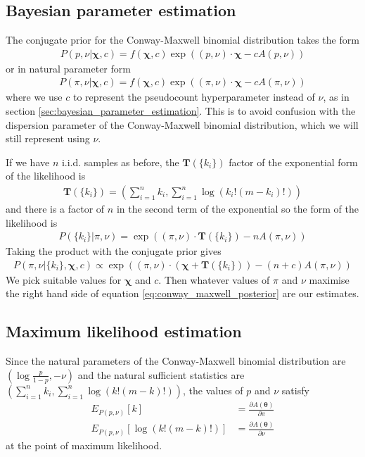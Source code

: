 \documentclass[a4paper,12pt]{article}
\theoremstyle{definition}
\newcommand{\pdiff}[2]{\frac{\partial #1}{\partial #2}} %
\begin{document}
\subsection{Bayesian parameter estimation}
The conjugate prior for the Conway-Maxwell binomial distribution takes the form
\begin{align}
  P(p, \nu | \boldsymbol{\chi}, c) = f(\boldsymbol{\chi}, c) \exp \left((p, \nu) \cdot \boldsymbol{\chi} - c A(p, \nu)\right)
\end{align}
or in natural parameter form 
\begin{align}
  P(\pi, \nu | \boldsymbol{\chi}, c) = f(\boldsymbol{\chi}, c) \exp \left((\pi, \nu) \cdot \boldsymbol{\chi} - c A(\pi, \nu)\right)
\end{align}
where we use $c$ to represent the pseudocount hyperparameter instead of $\nu$, as in section \ref{sec:bayesian_parameter_estimation}. This is to avoid confusion with the dispersion parameter of the Conway-Maxwell binomial distribution, which we will still represent using $\nu$.

If we have $n$ i.i.d. samples as before, the $\mathbf{T}(\lbrace k_i \rbrace)$ factor of the exponential form of the likelihood is 
\begin{align}
  \mathbf{T}(\lbrace k_i \rbrace) = \left( \sum_{i=1}^n k_i, \sum_{i=1}^n \log (k_i!(m - k_i)!) \right)
\end{align}
and there is a factor of $n$ in the second term of the exponential so the form of the likelihood is
\begin{align}
  P(\lbrace k_i \rbrace | \pi, \nu) = \exp \left( (\pi, \nu) \cdot \mathbf{T}(\lbrace k_i \rbrace) - nA (\pi, \nu)  \right)
\end{align}
Taking the product with the conjugate prior gives
\begin{align}\label{eq:conway_maxwell_posterior}
  P(\pi, \nu | \lbrace k_i \rbrace, \boldsymbol{\chi}, c) \propto \exp \left( (\pi, \nu) \cdot ( \boldsymbol{\chi} + \mathbf{T}(\lbrace k_i \rbrace)) - (n + c) A(\pi, \nu) \right)
\end{align}
We pick suitable values for $\boldsymbol{\chi}$ and $c$. Then whatever values of $\pi$ and $\nu$ maximise the right hand side of equation \ref{eq:conway_maxwell_posterior} are our estimates.

\subsection{Maximum likelihood estimation}
Since the natural parameters of the Conway-Maxwell binomial distribution are $\left( \log \frac{p}{1-p}, -\nu \right)$ and the natural sufficient statistics are $\left( \sum_{i=1}^n k_i, \sum_{i=1}^n \log (k! (m-k)!) \right)$, the values of $p$ and $\nu$ satisfy 
\begin{align}
  E_{P(p,\nu)}[k] & = \pdiff{A(\boldsymbol{\theta})}{\pi} \\
  E_{P(p, \nu)}[\log (k!(m-k)!)] & = \pdiff{A(\boldsymbol{\theta})}{\nu}
\end{align}
at the point of maximum likelihood.
\end{document}
